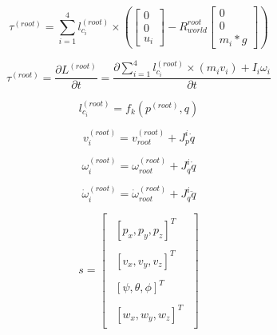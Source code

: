 \documentclass{jarticle}
\begin{document}
\begin{equation}
  \tau^{(root)} =
  \sum_{i=1}^{4}
  {l_{c_i}^{(root)}
    \times  (\left[ \begin{array}{c}
        0 \\
        0 \\
        u_i
      \end{array}\right]
    - R_{world}^{root}  \left[ \begin{array}{c}
        0 \\
        0 \\
        m_i*g
      \end{array}\right] )}
\end{equation}

\begin{equation}
  \tau^{(root)} =
  \frac{\partial L^{(root)}}{\partial t} =
  \frac{\partial \sum_{i=1}^{4}
  {l_{c_i}^{(root)}
    \times  (m_i v_i)
    + I_i \omega_i}}
  {\partial t}
\end{equation}

\begin{equation}
  l_{c_i}^{(root)} = f_k (p^{(root)}, {q})
\end{equation}

\begin{equation}
  v_i^{(root)} = v_{root}^{(root)} + J_p^i \dot{q}
\end{equation}

\begin{equation}
  \omega_i^{(root)} = \omega_{root}^{(root)} + J_q^i \dot{q}
\end{equation}

\begin{equation}
  \dot{\omega}_i^{(root)} = \dot{\omega}_{root}^{(root)} + J_q^i \ddot{q}
\end{equation}

\begin{equation}
  s = \left[ \begin{array}{c}
        \begin{array}{c}[p_x, p_y, p_z]^T\end{array} \\ \nonumber
        \begin{array}{c}[v_x, v_y, v_z]^T\end{array} \\ \nonumber
        \begin{array}{c}[\psi, \theta, \phi]^T\end{array} \\ \nonumber
        \begin{array}{c}[w_x, w_y, w_z]^T\end{array}
    \end{array}\right]
\end{equation}
\end{document}
